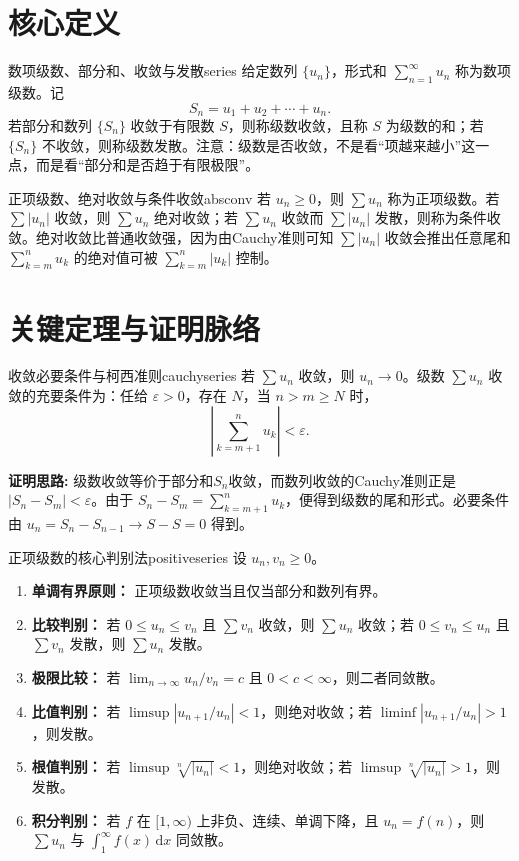 \documentclass[UTF8,zihao=-4,openany]{ctexbook}
\newcommand{\dd}{\,\mathrm{d}}
\begin{document}
\section{核心定义}
\begin{definition}{数项级数、部分和、收敛与发散}{series}
给定数列 $\{u_n\}$，形式和 $\sum_{n=1}^{\infty}u_n$ 称为数项级数。记
\[
S_n=u_1+u_2+\cdots+u_n.
\]
若部分和数列 $\{S_n\}$ 收敛于有限数 $S$，则称级数收敛，且称 $S$ 为级数的和；若 $\{S_n\}$ 不收敛，则称级数发散。注意：级数是否收敛，不是看“项越来越小”这一点，而是看“部分和是否趋于有限极限”。
\end{definition}

\begin{definition}{正项级数、绝对收敛与条件收敛}{absconv}
若 $u_n\ge 0$，则 $\sum u_n$ 称为正项级数。若 $\sum |u_n|$ 收敛，则 $\sum u_n$ 绝对收敛；若 $\sum u_n$ 收敛而 $\sum |u_n|$ 发散，则称为条件收敛。绝对收敛比普通收敛强，因为由Cauchy准则可知 $\sum |u_n|$ 收敛会推出任意尾和 $\sum_{k=m}^{n}u_k$ 的绝对值可被 $\sum_{k=m}^{n}|u_k|$ 控制。
\end{definition}

\section{关键定理与证明脉络}
\begin{theorem}{收敛必要条件与柯西准则}{cauchyseries}
若 $\sum u_n$ 收敛，则 $u_n\to0$。级数 $\sum u_n$ 收敛的充要条件为：任给 $\varepsilon>0$，存在 $N$，当 $n>m\ge N$ 时，
\[
\left|\sum_{k=m+1}^{n}u_k\right|<\varepsilon.
\]
\end{theorem}
\noindent\textbf{证明思路:} 级数收敛等价于部分和\(S_n\)收敛，而数列收敛的Cauchy准则正是 $|S_n-S_m|<\varepsilon$。由于 $S_n-S_m=\sum_{k=m+1}^{n}u_k$，便得到级数的尾和形式。必要条件由 $u_n=S_n-S_{n-1}\to S-S=0$ 得到。

\begin{theorem}{正项级数的核心判别法}{positiveseries}
设 $u_n,v_n\ge0$。
\begin{enumerate}
\item \textbf{单调有界原则：} 正项级数收敛当且仅当部分和数列有界。
\item \textbf{比较判别：} 若 $0\le u_n\le v_n$ 且 $\sum v_n$ 收敛，则 $\sum u_n$ 收敛；若 $0\le v_n\le u_n$ 且 $\sum v_n$ 发散，则 $\sum u_n$ 发散。
\item \textbf{极限比较：} 若 $\lim_{n\to\infty}u_n/v_n=c$ 且 $0<c<\infty$，则二者同敛散。
\item \textbf{比值判别：} 若 $\limsup |u_{n+1}/u_n|<1$，则绝对收敛；若 $\liminf |u_{n+1}/u_n|>1$，则发散。
\item \textbf{根值判别：} 若 $\limsup \sqrt[n]{|u_n|}<1$，则绝对收敛；若 $\limsup \sqrt[n]{|u_n|}>1$，则发散。
\item \textbf{积分判别：} 若 $f$ 在 $[1,\infty)$ 上非负、连续、单调下降，且 $u_n=f(n)$，则 $\sum u_n$ 与 $\int_1^\infty f(x)\dd x$ 同敛散。
\end{enumerate}
\end{theorem}
\end{document}
